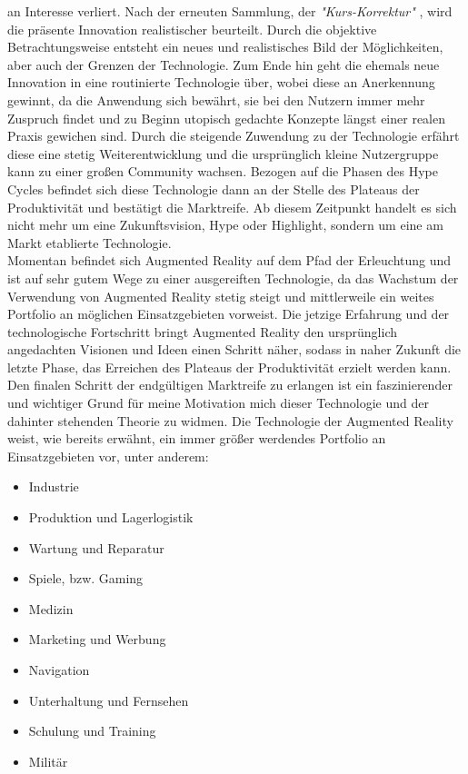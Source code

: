 an Interesse verliert. Nach der erneuten Sammlung, der \textit{"Kurs-Korrektur"} \cite{hypecycle.2019o}, wird die präsente Innovation 
realistischer beurteilt. Durch die objektive Betrachtungsweise entsteht ein neues und realistisches Bild der Möglichkeiten, aber auch 
der Grenzen der Technologie. Zum Ende hin geht die ehemals neue Innovation in eine routinierte Technologie über, wobei diese an 
Anerkennung gewinnt, da die Anwendung sich bewährt, sie bei den Nutzern immer mehr Zuspruch findet und zu Beginn utopisch gedachte Konzepte 
längst einer realen Praxis gewichen sind. Durch die steigende Zuwendung zu der Technologie  erfährt diese eine stetig Weiterentwicklung
und die ursprünglich kleine Nutzergruppe kann zu einer großen Community wachsen. Bezogen auf die Phasen des Hype Cycles befindet sich diese 
Technologie dann an der Stelle des Plateaus der Produktivität und bestätigt die Marktreife. Ab diesem Zeitpunkt handelt es sich nicht mehr 
um eine Zukunftsvision, Hype oder Highlight, sondern um eine am Markt etablierte Technologie.
\\ 
\linebreak
Momentan befindet sich Augmented Reality auf dem Pfad der Erleuchtung und ist auf sehr gutem Wege zu einer ausgereiften Technologie, 
da das Wachstum der Verwendung von Augmented Reality stetig steigt und mittlerweile ein weites Portfolio an möglichen Einsatzgebieten 
vorweist. Die jetzige Erfahrung und der technologische Fortschritt bringt Augmented Reality den  ursprünglich angedachten Visionen und Ideen 
einen Schritt näher, sodass in naher Zukunft die letzte Phase, das Erreichen des Plateaus der Produktivität erzielt werden kann. Den finalen 
Schritt der endgültigen Marktreife zu erlangen ist ein faszinierender und wichtiger Grund für meine Motivation mich dieser Technologie und 
der dahinter stehenden Theorie zu widmen. 
Die Technologie der Augmented Reality weist, wie bereits erwähnt, ein immer größer werdendes Portfolio an Einsatzgebieten vor, unter anderem: 
\begin{itemize}
    \item Industrie 
    \item Produktion und Lagerlogistik
    \item Wartung und Reparatur
    \item Spiele, bzw. Gaming 
    \item Medizin
    \item Marketing und Werbung
    \item Navigation
    \item Unterhaltung und Fernsehen 
    \item Schulung und Training
    \item Militär
\end{itemize} 

